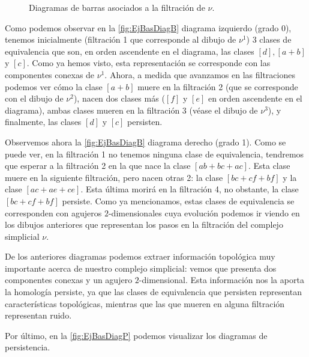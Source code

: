 \documentclass[12pt, a4paper, twoside]{book}
\numberwithin{equation}{section}
\theoremstyle{definition}
\newenvironment{ejem}
  {\pushQED{\qed}\renewcommand{\qedsymbol}{$\blacktriangleleft$}\ejemplo}
  {\popQED\endejemplo}
\theoremstyle{remark}
\theoremstyle{plain}
\begin{document}
\begin{ejem}
\begin{figure}[!htbp]
{\begin{figure}[H]
{}
			\end{figure}	
		\endminipage}
		\caption{Diagramas de barras asociados a la filtración de 
		{\Large $\nu$}.}
		\label{fig:EjBasDiagB}
	\end{figure}

	Como podemos observar en la \autoref{fig:EjBasDiagB} diagrama 
	izquierdo (grado 0), 
	tenemos inicialmente (filtración 1 que corresponde al dibujo de 
	{\Large $\nu$}$^{1}$) 3 clases de equivalencia que son, en orden 
	ascendente 
	en el diagrama, las clases $[d],[a+b]$ y $[c]$. Como ya hemos visto, 
	esta representación se corresponde con las componentes conexas de 
	{\Large $\nu$}$^{1}$. Ahora, a medida que avanzamos en las 
	filtraciones podemos ver cómo la clase $[a+b]$ muere en la filtración 
	2
	(que se corresponde con el dibujo de {\Large $\nu$}$^{2}$), nacen dos 
	clases más ($[f]$ y $[e]$ en orden ascendente en el diagrama), ambas 
	clases mueren en la filtración 3 (véase el dibujo de 
	{\Large $\nu$}$^{3}$), y finalmente, las clases $[d]$ y $[c]$ 
	persisten.
	
	Observemos ahora la \autoref{fig:EjBasDiagB} diagrama derecho 
	(grado 1). Como se puede 
	ver, en la filtración 1 no tenemos ninguna clase de equivalencia, 
	tendremos que esperar a la filtración 2 en la que nace la clase 
	$[ab+bc+ac]$. Esta clase muere en la siguiente filtración, pero nacen 
	otras 2: la clase $[bc+cf+bf]$ y la clase $[ac+ae+ce]$. Esta última 
	morirá en la filtración 4, no obstante, la clase $[bc+cf+bf]$ 
	persiste. Como ya mencionamos, estas clases de equivalencia se 
	corresponden con agujeros $2$-dimensionales cuya evolución podemos ir
	viendo en los dibujos anteriores que representan los pasos en la 
	filtración del complejo simplicial {\Large $\nu$}.

	De los anteriores diagramas podemos extraer información topológica 
	muy importante acerca de nuestro complejo simplicial: vemos que 
	presenta dos componentes conexas y un agujero $2$-dimensional. Esta 
	información nos la aporta la homología persiste, ya que las clases de 
	equivalencia que persisten representan características topológicas, 
	mientras que las que mueren en alguna filtración representan ruido.

	Por último, en la \autoref{fig:EjBasDiagP} podemos visualizar los 
	diagramas de persistencia.
	\begin{figure}[!htbp]
\end{figure}
\end{ejem}
\end{document}
